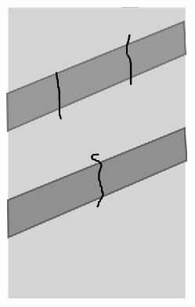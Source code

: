 \documentclass[a4paper,12pt,fleqn,twoside,openany]{book}
\begin{document}
\begin{figure}
\begin{subfigure}{0.2\textwidth}
        \caption{}%
        \label{fig: ValorR}
    \end{subfigure}
        \begin{subfigure}{0.2\textwidth}
        \includegraphics[width=\textwidth]{Img/Resultados/Resistencia/EsponjaR1.eps}
        \caption{}%
        \label{fig: EspR1 }
    \end{subfigure}
        \begin{subfigure}{0.2\textwidth}

\end{subfigure}
\end{figure}
\end{document}

